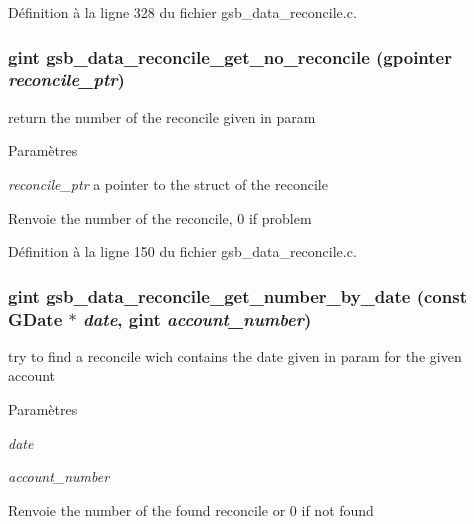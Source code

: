 Définition à la ligne 328 du fichier gsb\_\-data\_\-reconcile.c.

\subsubsection[{gsb\_\-data\_\-reconcile\_\-get\_\-no\_\-reconcile}]{\setlength{\rightskip}{0pt plus 5cm}gint gsb\_\-data\_\-reconcile\_\-get\_\-no\_\-reconcile (gpointer {\em reconcile\_\-ptr})}\label{gsb__data__reconcile_8c_a834a5ace0380c21559fb87cb88f7da80}
return the number of the reconcile given in param


\begin{DoxyParams}{Paramètres}
\item[{\em reconcile\_\-ptr}]a pointer to the struct of the reconcile\end{DoxyParams}
\begin{DoxyReturn}{Renvoie}
the number of the reconcile, 0 if problem 
\end{DoxyReturn}


Définition à la ligne 150 du fichier gsb\_\-data\_\-reconcile.c.

\subsubsection[{gsb\_\-data\_\-reconcile\_\-get\_\-number\_\-by\_\-date}]{\setlength{\rightskip}{0pt plus 5cm}gint gsb\_\-data\_\-reconcile\_\-get\_\-number\_\-by\_\-date (const GDate $\ast$ {\em date}, \/  gint {\em account\_\-number})}\label{gsb__data__reconcile_8c_a8b5fef84e7618bcd6f6ac22f28fbbbdd}
try to find a reconcile wich contains the date given in param for the given account


\begin{DoxyParams}{Paramètres}
\item[{\em date}]\item[{\em account\_\-number}]\end{DoxyParams}
\begin{DoxyReturn}{Renvoie}
the number of the found reconcile or 0 if not found 
\end{DoxyReturn}


